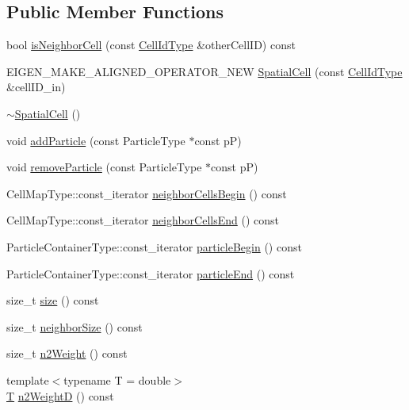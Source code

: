 \subsection*{Public Member Functions}
\begin{DoxyCompactItemize}
\item 
bool \hyperlink{structmodel_1_1_spatial_cell_a9f8d3d807daa4cbb10b123b46b32ec88}{is\+Neighbor\+Cell} (const \hyperlink{structmodel_1_1_spatial_cell_acc48b0ece2bb5487d1ea96903dbbe626}{Cell\+Id\+Type} \&other\+Cell\+I\+D) const 
\item 
E\+I\+G\+E\+N\+\_\+\+M\+A\+K\+E\+\_\+\+A\+L\+I\+G\+N\+E\+D\+\_\+\+O\+P\+E\+R\+A\+T\+O\+R\+\_\+\+N\+E\+W \hyperlink{structmodel_1_1_spatial_cell_a7ac7a4d96f408029906436e9f3c478e5}{Spatial\+Cell} (const \hyperlink{structmodel_1_1_spatial_cell_acc48b0ece2bb5487d1ea96903dbbe626}{Cell\+Id\+Type} \&cell\+I\+D\+\_\+in)
\item 
\hyperlink{structmodel_1_1_spatial_cell_ae43fc5e9aa87069d0a7616404370e331}{$\sim$\+Spatial\+Cell} ()
\item 
void \hyperlink{structmodel_1_1_spatial_cell_a11b2199f24e11b42b8e4536749a3806d}{add\+Particle} (const Particle\+Type $\ast$const p\+P)
\item 
void \hyperlink{structmodel_1_1_spatial_cell_a8265ce473eb2a0e4cffb6a3716ceed9d}{remove\+Particle} (const Particle\+Type $\ast$const p\+P)
\item 
Cell\+Map\+Type\+::const\+\_\+iterator \hyperlink{structmodel_1_1_spatial_cell_aa81f6d6adaeb324804b3e49722046cce}{neighbor\+Cells\+Begin} () const 
\item 
Cell\+Map\+Type\+::const\+\_\+iterator \hyperlink{structmodel_1_1_spatial_cell_a0c09bf0faff2e5d280636495678a93b6}{neighbor\+Cells\+End} () const 
\item 
Particle\+Container\+Type\+::const\+\_\+iterator \hyperlink{structmodel_1_1_spatial_cell_a2dc419f1064d57b95138de82b7f04702}{particle\+Begin} () const 
\item 
Particle\+Container\+Type\+::const\+\_\+iterator \hyperlink{structmodel_1_1_spatial_cell_aaa1028fea2f332ffd9276bef3f86eab5}{particle\+End} () const 
\item 
size\+\_\+t \hyperlink{structmodel_1_1_spatial_cell_ac0383947d2bf0837bb7202b1ec0770ec}{size} () const 
\item 
size\+\_\+t \hyperlink{structmodel_1_1_spatial_cell_ab294813ab5aaba5a5a3ee25c1ea1369c}{neighbor\+Size} () const 
\item 
size\+\_\+t \hyperlink{structmodel_1_1_spatial_cell_a7557b88dc86e7f9d2fe19beb1d5332af}{n2\+Weight} () const 
\item 
{\footnotesize template$<$typename T  = double$>$ }\\\hyperlink{_spline_node_base__corder1_8h_a82692d3a5502b91460591f1d5504314a}{T} \hyperlink{structmodel_1_1_spatial_cell_ac3584b0252b7d69b82e85c91f7085c05}{n2\+Weight\+D} () const 
\end{DoxyCompactItemize}
